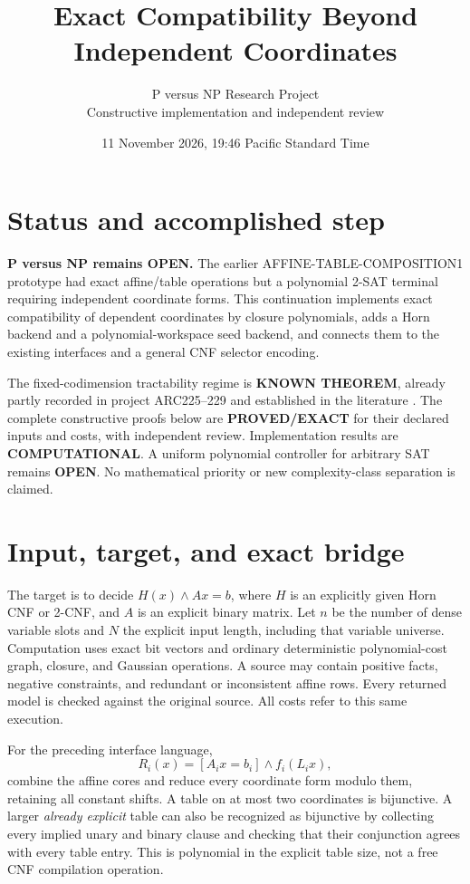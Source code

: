 \documentclass[11pt]{article}
\title{Exact Compatibility Beyond Independent Coordinates}
\author{P versus NP Research Project\\Constructive implementation and independent review}
\date{11 November 2026, 19:46 Pacific Standard Time}
\begin{document}
\maketitle

\section*{Status and accomplished step}
\textbf{P versus NP remains OPEN.} The earlier AFFINE-TABLE-COMPOSITION1
prototype had exact affine/table operations but a polynomial 2-SAT terminal
requiring independent coordinate forms. This continuation implements exact
compatibility of dependent coordinates by closure polynomials, adds a Horn
backend and a polynomial-workspace seed backend, and connects them to the
existing interfaces and a general CNF selector encoding.

The fixed-codimension tractability regime is \textbf{KNOWN THEOREM}, already
partly recorded in project ARC225--229 and established in the literature
\cite{arvind2021,brakensiek2019,mastrolilli2019}.
The complete constructive proofs below are \textbf{PROVED/EXACT}
for their declared inputs and costs, with independent review.
Implementation results are \textbf{COMPUTATIONAL}.
A uniform polynomial controller for arbitrary SAT remains \textbf{OPEN}.
No mathematical priority or new complexity-class separation is claimed.

\section{Input, target, and exact bridge}
The target is to decide \(H(x)\land Ax=b\), where \(H\) is an explicitly
given Horn CNF or 2-CNF, and \(A\) is an explicit binary matrix.
Let \(n\) be the number of dense variable slots and \(N\) the explicit input
length, including that variable universe. Computation uses exact bit vectors
and ordinary deterministic polynomial-cost graph, closure, and Gaussian
operations. A source may contain positive facts, negative constraints, and
redundant or inconsistent affine rows. Every returned model is checked
against the original source. All costs refer to this same execution.

For the preceding interface language,
\[
 R_i(x)=[A_i x=b_i]\land f_i(L_i x),
\]
combine the affine cores and reduce every coordinate form modulo them,
retaining all constant shifts. A table on at most two coordinates is
bijunctive. A larger \emph{already explicit} table can also be recognized
as bijunctive by collecting every implied unary and binary clause and
checking that their conjunction agrees with every table entry.
This is polynomial in the explicit table size, not a free CNF
compilation operation.
\end{document}
